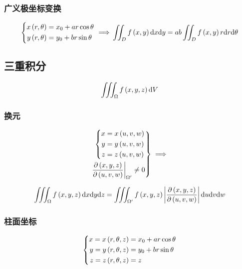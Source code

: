 \documentclass{article}
\begin{document}
\subsubsection{广义极坐标变换}

\[\left\{\begin{aligned}
        x\left(r,\theta\right) & =x_0+ar\cos\theta \\
        y\left(r,\theta\right) & =y_0+br\sin\theta
    \end{aligned}\right.\implies\\
    \iint_Df\left(x,y\right)\mathrm d x\mathrm d y=
    ab\iint_Df\left(x,y\right)r\mathrm d r\mathrm d\theta\]

\subsection{三重积分}

\begin{definition}[$\d V=\d x\d y\d z$]
    \[\iiint_\Omega f\left(x,y,z\right)\mathrm d V\]
\end{definition}

\subsubsection{换元}

\[\left.\begin{aligned}
        \left\{\begin{aligned}
                   x & =x\left(u,v,w\right) \\
                   y & =y\left(u,v,w\right) \\
                   z & =z\left(u,v,w\right)
               \end{aligned}\right. \\
        \left.\frac{\partial\left(x,y,z\right)}{\partial\left(u,v,w\right)}\right|_{\Omega^\prime}\neq0
    \end{aligned}\right\}\implies\]

\[\iiint_\Omega f\left(x,y,z\right)\mathrm d x\mathrm d y\mathrm d z=
    \iiint_{\Omega^\prime}f\left(x,y,z\right)\left|\frac{\partial\left(x,y,z\right)}{\partial\left(u,v,w\right)}\right|\mathrm d u\mathrm d v\mathrm d w\]

\subsubsection{柱面坐标}

\[\left\{\begin{aligned}
        x=x\left(r,\theta,z\right) & =x_0+ar\cos\theta \\
        y=y\left(r,\theta,z\right) & =y_0+br\sin\theta \\
        z=z\left(r,\theta,z\right) & =z
    \end{aligned}\right.\]
\end{document}
